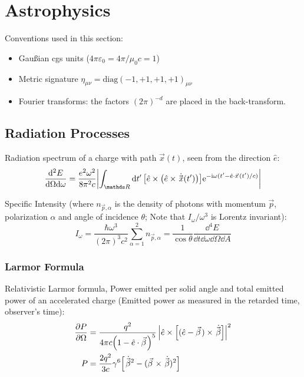\section{Astrophysics}
	Conventions used in this section:
	\begin{itemize}
		\item Gaußian cgs units ($4\pi\varepsilon_0 = 4 \pi / \mu_0 c = 1$)
		\item Metric signature $\eta_{\mu\nu}=\mathrm{diag}(-1,+1,+1,+1)_{\mu\nu}$
		\item Fourier transforms: the factors $(2\pi)^{-d}$ are placed in the back-transform.
	\end{itemize}

	\subsection{Radiation Processes}
		Radiation spectrum of a charge with path $\vec{x}(t)$, seen from the direction $\hat{e}$:
		\begin{equation}
			\frac{\dd^2 E}{\dd \Omega \dd \omega} = \frac{e^2 \omega^2}{8 \pi^2 c} \abs{\int_{\reals }\dd{t'} \qty[\hat{e}\times \qty(\hat{e}\times \dot{\vec{x}}(t'))] \ex^{-\i \omega (t'-\hat{e}\cdot \vec{x}(t')/c)}}
		\end{equation}

		\noindent
		Specific Intensity (where $n_{\vec{p},\alpha}$ is the density of photons with momentum $\vec{p}$, polarization $\alpha$ and angle of incidence $\theta$; Note that $I_\omega / \omega^3$ is Lorentz invariant):
		\begin{equation}
			I_\omega = \frac{\hbar \omega^3}{(2 \pi)^3 c^2} \sum_{\alpha=1}^{2} n_{\vec{p},\alpha} = \frac{1}{\cos \theta} \frac{\dd^4 E}{\dd t \dd\omega \dd \Omega \dd A}
		\end{equation}

		\subsubsection{Larmor Formula}
			Relativistic Larmor formula,
			Power emitted per solid angle and total emitted power of an accelerated charge (Emitted power as measured in the retarded time, \ie observer's time):
			\begin{equation}
				\label{eq:LarmorFormula}
				\begin{aligned}
					\pdv{P}{\Omega} &= \frac{q^2}{4\pi c\qty(1-\hat{e}\cdot\vec{\beta})^5} \left| \hat{e}\times\qty[(\hat{e}-\vec{\beta}) \times \dot{\vec{\beta}}] \right|^2 \\
					P &= \frac{2q^2}{3c}\gamma^6\qty[\dot{\vec{\beta}}^2 - (\vec{\beta}\times\dot{\vec{\beta}})^2] \\
				\end{aligned}
			\end{equation}

